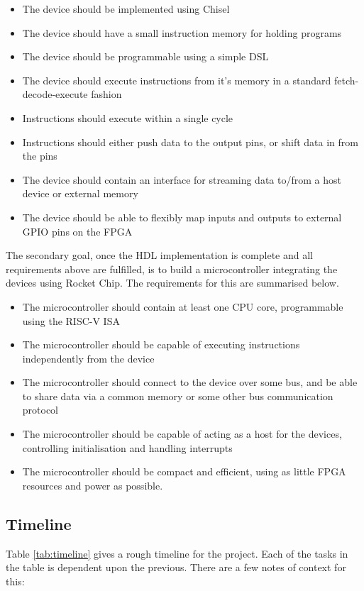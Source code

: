 \documentclass[a4paper,fleqn,12pt]{article}
\begin{document}
\begin{itemize}
	\item The device should be implemented using Chisel
	\item The device should have a small instruction memory for holding programs
	\item The device should be programmable using a simple DSL
	\item The device should execute instructions from it's memory in a standard fetch-decode-execute fashion
	\item Instructions should execute within a single cycle
	\item Instructions should either push data to the output pins, or shift data in from the pins
	\item The device should contain an interface for streaming data to/from a host device or external memory
	\item The device should be able to flexibly map inputs and outputs to external GPIO pins on the FPGA
\end{itemize}

The secondary goal, once the HDL implementation is complete and all requirements above are fulfilled, is to build a microcontroller integrating the devices using Rocket Chip. The requirements for this are summarised below.

\begin{itemize}
	\item The microcontroller should contain at least one CPU core, programmable using the RISC-V ISA
	\item The microcontroller should be capable of executing instructions independently from the device
	\item The microcontroller should connect to the device over some bus, and be able to share data via a common memory or some other bus communication protocol
	\item The microcontroller should be capable of acting as a host for the devices, controlling initialisation and handling interrupts
	\item The microcontroller should be compact and efficient, using as little FPGA resources and power as possible.
\end{itemize}

\subsection{Timeline}
\label{sec:timeline}

Table \ref{tab:timeline} gives a rough timeline for the project. Each of the tasks in the table is dependent upon the previous. There are a few notes of context for this:
\end{document}
